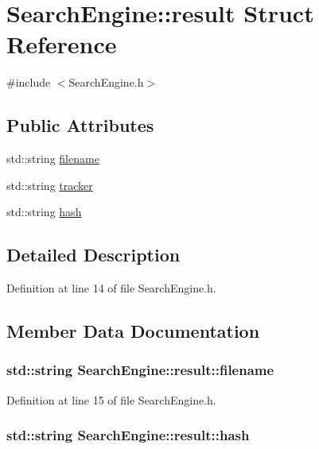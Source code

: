 \hypertarget{structSearchEngine_1_1result}{
\section{SearchEngine::result Struct Reference}
\label{structSearchEngine_1_1result}
}


{\ttfamily \#include $<$SearchEngine.h$>$}

\subsection*{Public Attributes}
\begin{DoxyCompactItemize}
\item 
std::string \hyperlink{structSearchEngine_1_1result_a32d471ce69273df306b70df4ca20bfb3}{filename}
\item 
std::string \hyperlink{structSearchEngine_1_1result_a18de1c2bd486ec196e1599493c049e7f}{tracker}
\item 
std::string \hyperlink{structSearchEngine_1_1result_afcd84d164b4054e956fe699de6d57561}{hash}
\end{DoxyCompactItemize}


\subsection{Detailed Description}


Definition at line 14 of file SearchEngine.h.



\subsection{Member Data Documentation}
\hypertarget{structSearchEngine_1_1result_a32d471ce69273df306b70df4ca20bfb3}{
\subsubsection[{filename}]{\setlength{\rightskip}{0pt plus 5cm}std::string {\bf SearchEngine::result::filename}}}
\label{structSearchEngine_1_1result_a32d471ce69273df306b70df4ca20bfb3}


Definition at line 15 of file SearchEngine.h.

\hypertarget{structSearchEngine_1_1result_afcd84d164b4054e956fe699de6d57561}{
\subsubsection[{hash}]{\setlength{\rightskip}{0pt plus 5cm}std::string {\bf SearchEngine::result::hash}}}
\label{structSearchEngine_1_1result_afcd84d164b4054e956fe699de6d57561}



